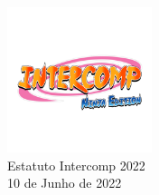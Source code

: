 \begin{center}

	\vspace*{\fill}
	{\let\clearpage\relax \includegraphics[width=120pt]{../logo-ninja-edition.jpg} \\ [.5cm]}
	\Huge{Estatuto Intercomp 2022} \\ [.5cm]
	\normalsize{10 de Junho de 2022}
	\vspace*{\fill}

\end{center}
